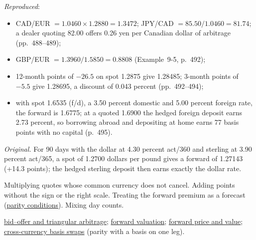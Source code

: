 \begin{qfmethod}
 \emph{Reproduced}:
\begin{itemize}
\item CAD/EUR $=1.0460\times1.2880=1.3472$; JPY/CAD $=85.50/1.0460=81.74$; a dealer quoting 82.00 offers 0.26 yen per Canadian dollar of arbitrage (pp.~488--489);
\item GBP/EUR $=1.3960/1.5850=0.8808$ (Example~9-5, p.~492);
\item 12-month points of $-26.5$ on spot 1.2875 give 1.28485; 3-month points of $-5.5$ give 1.28695, a discount of 0.043 percent (pp.~492--494);
\item with spot 1.6535 (f/d), a 3.50 percent domestic and 5.00 percent foreign rate, the forward is 1.6775; at a quoted 1.6900 the hedged foreign deposit earns 2.73 percent, so borrowing abroad and depositing at home earns 77 basis points with no capital (p.~495).
\end{itemize}
\emph{Original.} For 90 days with the dollar at 4.30 percent act/360 and sterling at 3.90 percent act/365, a spot of 1.2700 dollars per pound gives a forward of 1.27143 (+14.3 points); the hedged sterling deposit then earns exactly the dollar rate.

 Multiplying quotes whose common currency does not cancel. Adding points without the sign or the right scale. Treating the forward premium as a forecast (\hyperref[res:international-parity-conditions]{parity conditions}). Mixing day counts.

 \hyperref[meth:fx-bid-offer-triangular-arbitrage]{bid--offer and triangular arbitrage}; \hyperref[meth:currency-forward-mark-to-market]{forward valuation}; \hyperref[meth:forward-price-value-lifecycle]{forward price and value}; \hyperref[meth:cross-currency-basis-swaps]{cross-currency basis swaps} (parity with a basis on one leg).

\end{qfmethod}

